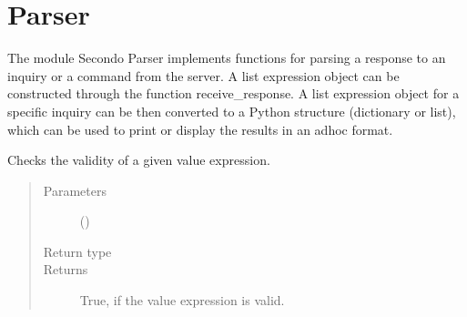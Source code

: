 \documentclass[letterpaper,10pt,english]{sphinxmanual}
\begin{document}
\section{ Parser}
\label{\detokenize{index:module-secondodb.api.support.secondoparser}}\label{\detokenize{index:sec-parser}}
The module Secondo Parser implements functions for parsing a response to an inquiry or a command from the 
server. A list expression object can be constructed through the function receive\_response. A list expression object
for a specific inquiry can be then converted to a Python structure (dictionary or list), which can be used to print or
display the results in an ad\sphinxhyphen{}hoc format.

\begin{fulllineitems}
\label{\detokenize{index:secondodb.api.support.secondoparser.check_identifier}}
Checks the validity of a given value expression.
\begin{quote}\begin{description}
\item[{Parameters}] \leavevmode
{} () \textendash{} 

\item[{Return type}] \leavevmode
{}

\item[{Returns}] \leavevmode
True, if the value expression is valid.

\end{description}\end{quote}

\end{fulllineitems}

\end{document}
